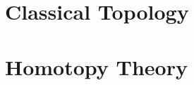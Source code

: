 \documentclass[../../deep-dive]{subfiles}
\begin{document}
\part{Classical Topology}



\part{Homotopy Theory}


\end{document}
